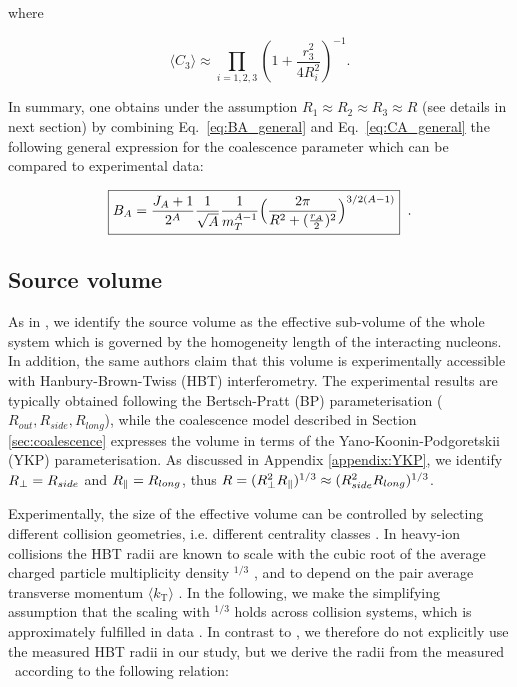 \documentclass[a4paper,11pt]{scrartcl} %
\begin{document}
 where

 \begin{equation}
\langle C_{3} \rangle \approx \prod_{i=1,2,3} \left(1 + \frac{r_{3}^2}{4R_{i}^2} \right)^{-1}.
\label{eq:C3}
\end{equation}
 
In summary, one obtains under the assumption $R_1\approx R_2 \approx R_3 \approx R$ (see details in next section) by combining Eq.~\ref{eq:BA_general} and Eq.~\ref{eq:CA_general} the following general expression for the coalescence parameter which can be compared to experimental data:

\begin{equation}
	\boxed {  B_{A} = {J_{A} + 1 \over 2^{A}} {1 \over \sqrt{A}} {1 \over m_{T}^{A-1}} \Bigl({2\pi \over R^2 + ({r_A \over 2})^2 }\Bigr)^{3/2(A-1)} } \;\; .
\end{equation}

 



\subsection{Source volume}
\label{SecSourceVolume}
As in \cite{Scheibl:1998tk}, we identify the source volume as the effective sub-volume of the whole system which is governed by the homogeneity length of the interacting nucleons. In addition, the same authors claim that this volume is experimentally accessible with Hanbury-Brown-Twiss (HBT) interferometry. 
The experimental results are typically obtained following the Bertsch-Pratt (BP) parameterisation ($R_{out}, R_{side}, R_{long}$), while the coalescence model described in Section \ref{sec:coalescence} expresses the volume in terms of the Yano-Koonin-Podgoretskii (YKP) parameterisation. As discussed in Appendix \ref{appendix:YKP}, we identify $R_{\perp} = R_{side}$ and $R_{\|} = R_{long}$, thus $R = (R_{\perp}^{2}R_{\|})^{1/3} \approx (R_{side}^{2}R_{long})^{1/3}$.

Experimentally, the size of the effective volume can be controlled by selecting different collision geometries, i.e. different centrality classes \cite{Abelev:2013qoq}. In heavy-ion collisions the HBT radii are known to scale with the cubic root of the average charged particle multiplicity density \avdNdeta$^{1/3}$ \cite{Adam:2015vna}, and to depend on the pair average transverse momentum $\langle k_{\mathrm{T}}\rangle$ \cite{Aamodt:2011mr}. In the following, we make the simplifying assumption that the scaling with \avdNdeta$^{1/3}$ holds across collision systems, which is approximately fulfilled in data \cite{Adam:2015pya}. In contrast to \cite{Blum:2017qnn}, we therefore do not explicitly use the measured HBT radii in our study, but we derive the radii from the measured \avdNdeta~according to the following relation:
\end{document}

